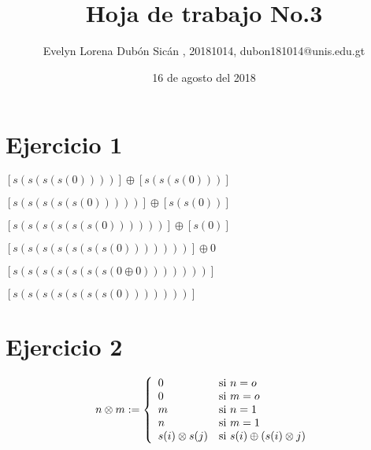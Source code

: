 \documentclass{article}
\author{Evelyn Lorena Dubón Sicán , 20181014, dubon181014@unis.edu.gt}
\title{Hoja de trabajo No.3}
\date{16 de agosto del 2018}
\begin{document}
\linespread{1.1}

\maketitle

\section{Ejercicio 1}\par
\begin{center}

$[s(s(s(s(0))))] \oplus [s(s(s(0)))]$ 
\end{center}
\begin{center}
$[s(s(s(s(s(0)))))] \oplus [s(s(0))] $
\end{center}
\begin{center}
$[s(s(s(s(s(s(0))))))] \oplus [s(0)]$ 
\end{center}
\begin{center}
$[s(s(s(s(s(s(s(0)))))))] \oplus 0 $
\end{center}
\begin{center}
$[s(s(s(s(s(s(s(0\oplus 0)))))))]$
\end{center}
\begin{center}
$[s(s(s(s(s(s(s(0)))))))]$
\end{center}
\section{Ejercicio 2}
\[
n\otimes m := \left\{
\begin{array}{l l}
0 & \mbox{si } n=o \\
0 & \mbox{si } m=o \\
m & \mbox{si } n=1 \\
n & \mbox{si } m=1 \\ 
s(i)\otimes s(j) & \mbox{si } s(i) \oplus (s(i)\otimes j)\\
\end{array}
\right.
 \]
\end{document}
